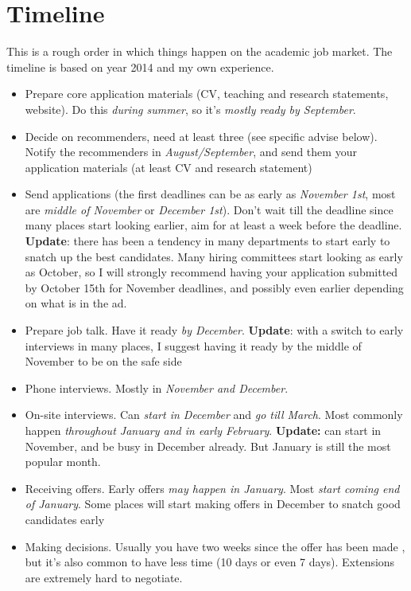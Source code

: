 \documentclass{article}
\begin{document}
\section{Timeline}
This is a rough order in which things happen on the academic job market. The timeline is based on year 2014 and my own experience.
\begin{itemize}
\item Prepare core application materials (CV, teaching and research statements, website). Do this \textit{during summer}, so it's \textit{mostly ready by September}.
\item Decide on recommenders, need at least three (see specific advise below). Notify the recommenders in \textit{August/September}, and send them your application materials (at least CV and research statement)
\item Send applications (the first deadlines can be as early as \textit{November 1st}, most are \textit{middle of November} or \textit{December 1st}). Don't wait till the deadline since many places start looking earlier, aim for at least a week before the deadline. {\color{red} \textbf{Update}: there has been a tendency in many departments to start early to snatch up the best candidates. Many hiring committees start looking as early as October, so I will strongly recommend having your application submitted by October 15th for November deadlines, and possibly even earlier depending on what is in the ad.}
\item Prepare job talk. Have it ready \textit{by December}. {\color{red} \textbf{Update}: with a switch to early interviews in many places, I suggest having it ready by the middle of November to be on the safe side}
\item Phone interviews. Mostly in \textit{November and December}.
\item On-site interviews. Can  \textit{start in December} and \textit{go till March}. Most commonly happen \textit{throughout January and in early February}. {\color{red} \textbf{Update:} can start in November, and be busy in December already. But January is still the most popular month.}
\item Receiving offers. Early offers \textit{may happen in January}. Most \textit{start coming end of January}. {\color{red} Some places will start making offers in December to snatch good candidates early}
\item Making decisions. Usually you have two weeks since the offer has been made {\color{red}, but it's also common to have less time (10 days or even 7 days)}. Extensions are extremely hard to negotiate.
\end{itemize}
\end{document}
